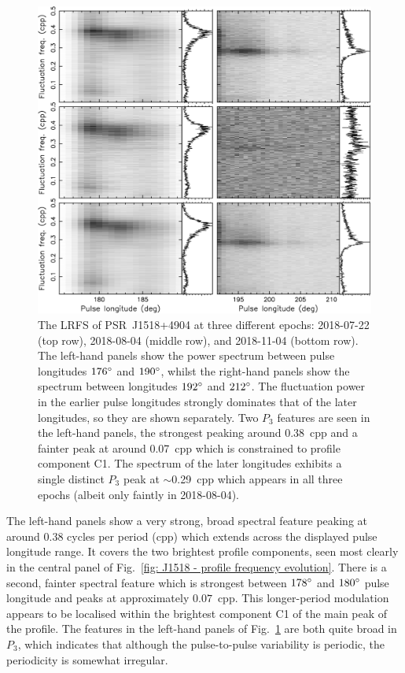 \begin{figure}
    \begin{center}
        \includegraphics[width=1.0\textwidth]{Figures/J1518/lrfs_time_evolution_2}
        \caption[Longitude-resolved fluctuation spectra of PSR~J1518+4904]{The LRFS of PSR~J1518+4904 at three different epochs: 2018-07-22 (top row), 2018-08-04 (middle row), and 2018-11-04 (bottom row). The left-hand panels show the power spectrum between pulse longitudes $176^\circ$ and $190^\circ$, whilst the right-hand panels show the spectrum between longitudes $192^\circ$ and $212^\circ$. The fluctuation power in the earlier pulse longitudes strongly dominates that of the later longitudes, so they are shown separately. Two $P_3$ features are seen in the left-hand panels, the strongest peaking around 0.38~cpp and a fainter peak at around 0.07~cpp which is constrained to profile component C1. The spectrum of the later longitudes exhibits a single distinct $P_3$ peak at $\sim$0.29~cpp which appears in all three epochs (albeit only faintly in 2018-08-04).}
        \label{fig: J1518 - lrfs time evolution}
    \end{center}
\end{figure}

The left-hand panels show a very strong, broad spectral feature peaking at around 0.38 cycles per period (cpp) which extends across the displayed pulse longitude range. It covers the two brightest profile components, seen most clearly in the central panel of Fig.~\ref{fig: J1518 - profile frequency evolution}. There is a second, fainter spectral feature which is strongest between $178^\circ$ and $180^\circ$ pulse longitude and peaks at approximately $0.07$~cpp. This longer-period modulation appears to be localised within the brightest component C1 of the main peak of the profile. The features in the left-hand panels of Fig.~\ref{fig: J1518 - lrfs time evolution} are both quite broad in $P_3$, which indicates that although the pulse-to-pulse variability is periodic, the periodicity is somewhat irregular.

